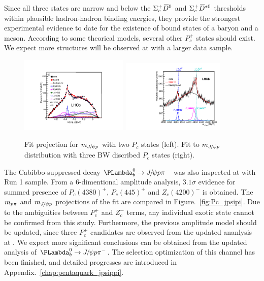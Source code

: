 Since all three states are narrow and below the $\Sigma_{c}^{+}{{\kern 0.18em\overline{\kern -0.18em D}}{}^0}$ and $\Sigma_{c}^{+}{{\kern 0.18em\overline{\kern -0.18em D}}{}^{*0}}$ thresholds 
within plausible hadron-hadron binding energies, 
they provide the strongest experimental evidence to date for the existence of bound states of a baryon and a meson. 
According to some theorical models\supercite{PhysRev.134.B1307,PhysRevC.98.045208,MAIANI2018247,Bugg_2008,PhysRevD.91.051504},
several other $P_{c}^+$ states should exist.
We expect more structures will be observed at \lhcb with a larger data sample. 


\begin{figure}[!hbtp]
\centering
   \includegraphics[width=0.46\textwidth]{Figures/01_Introduction/Exotic/Pc_states/2015-lhcb-Lb2jpsipK-mjpsip-default-slo} %
   \includegraphics[width=0.44\textwidth]{Figures/01_Introduction/Exotic/Pc_states/2019-pentaquarks_nominal_fit_and_thresholds} %
   \caption{ 
   Fit projection for $m_{{{J\mskip -3mu/\mskip -2mu\psi}}{p}}$ with two $P_{c}$ states (left)\supercite{LHCb-PAPER-2015-029}.    
   Fit to $m_{{{J\mskip -3mu/\mskip -2mu\psi}}{p}}$ distribution with three BW discribed $P_{c}$ states (right)\supercite{LHCb-PAPER-2019-014}. }
\label{fig:Pc_mass}
\end{figure}

The Cabibbo-suppressed decay $\Lb\to\jpsi\proton\pim$ was also inspected at \lhcb with Run 1 sample\supercite{LHCb-PAPER-2016-015}.
From a 6-dimentional amplitude analysis,
$3.1\sigma$ evidence for summed presence of $P_{c}(4380)^+$, $P_{c}(445)^+$ and $Z_{c}(4200)^{-}$ is obtained.
The $m_{{p}\pi}$ and $m_{{{J\mskip -3mu/\mskip -2mu\psi}}{p}}$ projections of the fit are compared in Figure.~\ref{fig:Pc_jpsipi}.
Due to the ambiguities between $P_{c}^+$ and $Z_{c}^-$ terms,
any individual exotic state cannot be confirmed from this study.
Furthermore,
the previous amplitude model should be updated,
since three $P_{c}^+$ candidates are observed from the updated ananlysis at \lhcb\supercite{LHCb-PAPER-2019-014}.
We expect more significant conclusions can be obtained from the updated analysis of $\Lb\to\jpsi\proton\pim$.
The selection optimization of this channel has been finished,
and detailed progresses are introduced in Appendix.~\ref{chap:pentaquark_jpsippi}.


